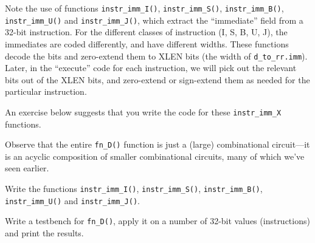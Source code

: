 Note the use of functions \verb|instr_imm_I()|, \verb|instr_imm_S()|,
\verb|instr_imm_B()|, \verb|instr_imm_U()| and \verb|instr_imm_J()|,
which extract the ``immediate'' field from a 32-bit instruction.  For
the different classes of instruction (I, S, B, U, J), the immediates
are coded differently, and have different widths.  These functions
decode the bits and zero-extend them to XLEN bits (the width of
\verb|d_to_rr.imm|).  Later, in the ``execute'' code for each
instruction, we will pick out the relevant bits out of the XLEN bits,
and zero-extend or sign-extend them as needed for the particular
instruction.

An exercise below suggests that you write the code for these
\verb|instr_imm_X| functions.

Observe that the entire \verb|fn_D()| function is just a (large)
combinational circuit---it is an acyclic composition of smaller
combinational circuits, many of which we've seen earlier.


\hdivider

\Exercise

Write the functions \verb|instr_imm_I()|, \verb|instr_imm_S()|,
\verb|instr_imm_B()|, \verb|instr_imm_U()| and \verb|instr_imm_J()|.

\Exercise

Write a testbench for \verb|fn_D()|, apply it on a number of 32-bit
values (instructions) and print the results.

\Endexercise

